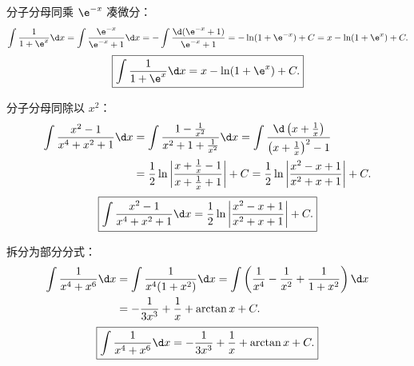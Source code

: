 \begin{solution}

    分子分母同乘 $\e^{-x}$ 凑微分：
    \begin{equation}
        \int \frac{1}{1 + \e^x} \d x = \int \frac{\e^{-x}}{\e^{-x} + 1} \d x = -\int \frac{\d(\e^{-x} + 1)}{\e^{-x} + 1} = -\ln(1 + \e^{-x}) + C = x - \ln(1 + \e^x) + C.
    \end{equation}
    \begin{equation}
        \boxed{\int \frac{1}{1 + \e^x} \d x = x - \ln(1 + \e^x) + C.}
    \end{equation}


    分子分母同除以 $x^2$：
    \begin{equation}
        \begin{aligned}
            \int \frac{x^2 - 1}{x^4 + x^2 + 1} \d x & = \int \frac{1 - \frac{1}{x^2}}{x^2 + 1 + \frac{1}{x^2}} \d x = \int \frac{\d\left(x + \frac{1}{x}\right)}{\left(x + \frac{1}{x}\right)^2 - 1}         \\
                                                    & = \frac{1}{2}\ln\left| \frac{x + \frac{1}{x} - 1}{x + \frac{1}{x} + 1} \right| + C = \frac{1}{2}\ln\left| \frac{x^2 - x + 1}{x^2 + x + 1} \right| + C.
        \end{aligned}
    \end{equation}
    \begin{equation}
        \boxed{\int \frac{x^2 - 1}{x^4 + x^2 + 1} \d x = \frac{1}{2}\ln\left| \frac{x^2 - x + 1}{x^2 + x + 1} \right| + C.}
    \end{equation}


    拆分为部分分式：
    \begin{equation}
        \begin{aligned}
            \int \frac{1}{x^4 + x^6} \d x & = \int \frac{1}{x^4(1 + x^2)} \d x = \int \left( \frac{1}{x^4} - \frac{1}{x^2} + \frac{1}{1 + x^2} \right) \d x \\
                                          & = -\frac{1}{3x^3} + \frac{1}{x} + \arctan x + C.
        \end{aligned}
    \end{equation}
    \begin{equation}
        \boxed{\int \frac{1}{x^4 + x^6} \d x = -\frac{1}{3x^3} + \frac{1}{x} + \arctan x + C.}
    \end{equation}


\end{solution}
